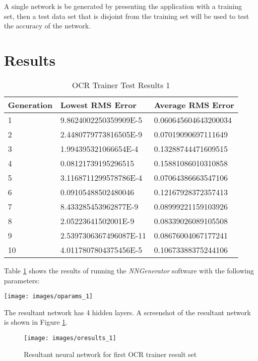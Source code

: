A single network is be generated by presenting the application with a training set, then a test data set that is disjoint from the training set will be used to test the accuracy of the network.


\section{Results}  

\begin{center}
    \begin{longtable}{ | l | l | l |}
      \caption{OCR Trainer Test Results 1} \label{ocr1} \\
    \hline
  Generation & Lowest RMS Error & Average RMS Error \\ \hline
1 &	9.8624002250359909E-5 &	0.060645604643200034 \\ \hline
2 &	2.4480779773816505E-9 &	0.07019090697111649 \\ \hline
3 &	1.994395321066654E-4 &	0.13288744471609515 \\ \hline
4 &	0.08121739195296515 &	0.15881086010310858 \\ \hline
5 &	3.1168711299578786E-4	& 0.07064386663547106 \\ \hline
6 &	0.09105488502480046 &	0.12167928372357413 \\ \hline
7 &	8.433285453962877E-9 &	0.08999221159103926 \\ \hline
8 &	2.05223641502001E-9 &	0.08339026089105508 \\ \hline
9 &	2.5397306367496087E-11 &	0.08676004067177241 \\ \hline
10 & 4.0117807804375456E-5 &	0.10673388375244106 \\ \hline
\end{longtable}
\end{center}

Table \ref{ocr1} shows the results of running the {\it NNGenerator} software with the following parameters:

\begin{center}
\texttt{[image: images/oparams\_1]}
\end{center}

The resultant network has 4 hidden layers.
A screenshot of the resultant network is shown in Figure \ref{oresults_1}.

\begin{figure}[h!]
  \centering
  \texttt{[image: images/oresults\_1]}
  \caption{Resultant neural network for first OCR trainer result set}
  \label{oresults_1}
\end{figure}

